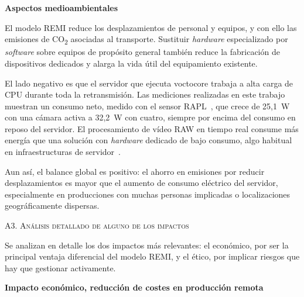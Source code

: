 \vspace{0.15cm}
\noindent\textbf{Aspectos medioambientales}\\
\normalsize{El modelo REMI reduce los desplazamientos de personal y equipos, y con ello las
emisiones de CO\textsubscript{2} asociadas al transporte. Sustituir \textit{hardware} especializado por
\textit{software} sobre equipos de propósito general también reduce la fabricación de dispositivos
dedicados y alarga la vida útil del equipamiento existente.

El lado negativo es que el servidor que ejecuta voctocore trabaja a alta carga de CPU durante toda
la retransmisión. Las mediciones realizadas en este trabajo muestran un consumo neto, medido con el
sensor RAPL~\cite{khan2018rapl}, que crece de 25,1~W con una cámara activa a 32,2~W con cuatro,
siempre por encima del consumo en reposo del servidor. El procesamiento de vídeo RAW en tiempo real
consume más energía que una solución con \textit{hardware} dedicado de bajo consumo, algo habitual
en infraestructuras de servidor~\cite{iea_datacentres_2023}.

Aun así, el balance global es positivo: el ahorro en emisiones por reducir desplazamientos es
mayor que el aumento de consumo eléctrico del servidor, especialmente en producciones con muchas
personas implicadas o localizaciones geográficamente dispersas.}
\vspace{0.3cm}

\Large{\textsc{\textcolor{nar}{A3. Análisis detallado de alguno de los impactos}}}
\vspace{0.2cm}

\normalsize{Se analizan en detalle los dos impactos más relevantes: el económico, por ser la
principal ventaja diferencial del modelo REMI, y el ético, por implicar riesgos que hay que
gestionar activamente.}

\vspace{0.15cm}
\textbf{Impacto económico, reducción de costes en producción remota}

